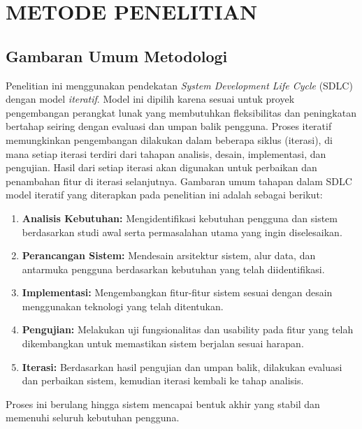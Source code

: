 \chapter{METODE PENELITIAN}

\section{Gambaran Umum Metodologi}

Penelitian ini menggunakan pendekatan \textit{System Development Life Cycle} (SDLC) dengan model \textit{iteratif}. Model ini dipilih karena sesuai untuk proyek pengembangan perangkat lunak yang membutuhkan fleksibilitas dan peningkatan bertahap seiring dengan evaluasi dan umpan balik pengguna. Proses iteratif memungkinkan pengembangan dilakukan dalam beberapa siklus (iterasi), di mana setiap iterasi terdiri dari tahapan analisis, desain, implementasi, dan pengujian. Hasil dari setiap iterasi akan digunakan untuk perbaikan dan penambahan fitur di iterasi selanjutnya.
\singlespacing{}
Gambaran umum tahapan dalam SDLC model iteratif yang diterapkan pada penelitian ini adalah sebagai berikut:

\begin{enumerate}
  \item \textbf{Analisis Kebutuhan:} Mengidentifikasi kebutuhan pengguna dan sistem berdasarkan studi awal serta permasalahan utama yang ingin diselesaikan.
  \item \textbf{Perancangan Sistem:} Mendesain arsitektur sistem, alur data, dan antarmuka pengguna berdasarkan kebutuhan yang telah diidentifikasi.
  \item \textbf{Implementasi:} Mengembangkan fitur-fitur sistem sesuai dengan desain menggunakan teknologi yang telah ditentukan.
  \item \textbf{Pengujian:} Melakukan uji fungsionalitas dan usability pada fitur yang telah dikembangkan untuk memastikan sistem berjalan sesuai harapan.
  \item \textbf{Iterasi:} Berdasarkan hasil pengujian dan umpan balik, dilakukan evaluasi dan perbaikan sistem, kemudian iterasi kembali ke tahap analisis.
\end{enumerate}

\noindent
Proses ini berulang hingga sistem mencapai bentuk akhir yang stabil dan memenuhi seluruh kebutuhan pengguna.





